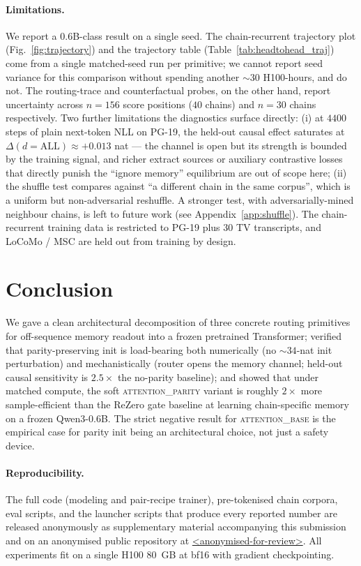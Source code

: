 \documentclass{article}
\begin{document}
\paragraph{Limitations.}
\label{sec:limits}
We report a $0.6$B-class result on a single seed.  The
chain-recurrent trajectory plot (Fig.~\ref{fig:trajectory}) and the
trajectory table (Table~\ref{tab:headtohead_traj}) come from a single
matched-seed run per primitive; we cannot report seed variance for
this comparison without spending another ${\sim}30$ H100-hours, and
do not.  The routing-trace and counterfactual probes, on the other
hand, report uncertainty across $n=156$ score positions
($40$ chains) and $n=30$ chains respectively.  Two further limitations
the diagnostics surface directly: (i) at $4400$ steps of plain
next-token NLL on PG-19, the held-out causal effect saturates at
$\Delta(d{=}\mathrm{ALL}) \approx +0.013$ nat --- the channel is open
but its strength is bounded by the training signal, and richer
extract sources or auxiliary contrastive losses that directly punish
the ``ignore memory'' equilibrium are out of scope here; (ii) the
shuffle test compares against ``a different chain in the same
corpus'', which is a uniform but non-adversarial reshuffle.  A
stronger test, with adversarially-mined neighbour chains, is left to
future work (see Appendix~\ref{app:shuffle}).  The chain-recurrent
training data is restricted to PG-19 plus $30$ TV transcripts, and
LoCoMo / MSC are held out from training by design.

\section{Conclusion}
We gave a clean architectural decomposition of three concrete
routing primitives for off-sequence memory readout into a frozen
pretrained Transformer; verified that parity-preserving init is
load-bearing both numerically (no $\sim$$34$-nat init perturbation)
and mechanistically (router opens the memory channel; held-out
causal sensitivity is $2.5\times$ the no-parity baseline); and
showed that under matched compute, the soft \textsc{attention\_parity}
variant is roughly $2\times$ more sample-efficient than the ReZero
gate baseline at learning chain-specific memory on a frozen
Qwen3-0.6B.  The strict negative result for \textsc{attention\_base}
is the empirical case for parity init being an architectural
choice, not just a safety device.

\paragraph{Reproducibility.}
The full code (modeling and pair-recipe trainer), pre-tokenised
chain corpora, eval scripts, and the launcher scripts that produce
every reported number are released anonymously as supplementary
material accompanying this submission and on an anonymised public
repository at \url{<anonymised-for-review>}.  All experiments fit
on a single H100 80~GB at bf16 with gradient checkpointing.
\end{document}
